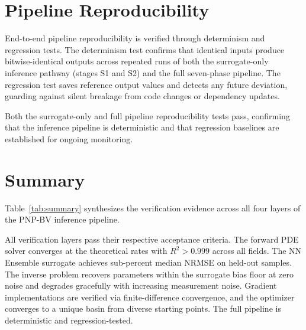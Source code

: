 \documentclass[11pt,a4paper]{article}
\begin{document}
\section{Pipeline Reproducibility}
\label{sec:reproducibility}

End-to-end pipeline reproducibility is verified through determinism and
regression tests. The determinism test confirms that identical inputs
produce bitwise-identical outputs across repeated runs of both the
surrogate-only inference pathway (stages S1 and S2) and the full
seven-phase pipeline. The regression test saves reference output values
and detects any future deviation, guarding against silent breakage from
code changes or dependency updates.

Both the surrogate-only and full pipeline reproducibility tests pass,
confirming that the inference pipeline is deterministic and that
regression baselines are established for ongoing monitoring.

\section{Summary}
\label{sec:summary}

Table~\ref{tab:summary} synthesizes the verification evidence across all
four layers of the PNP-BV inference pipeline.

\begin{table}[htbp]
\centering
\caption{Verification summary across all pipeline layers. Each test
includes the key quantitative result and pass/fail status.}
\label{tab:summary}

\end{table}

All verification layers pass their respective acceptance criteria. The
forward PDE solver converges at the theoretical rates with $R^2 > 0.999$
across all fields. The NN Ensemble surrogate achieves sub-percent median
NRMSE on held-out samples. The inverse problem recovers parameters within
the surrogate bias floor at zero noise and degrades gracefully with
increasing measurement noise. Gradient implementations are verified via
finite-difference convergence, and the optimizer converges to a unique
basin from diverse starting points. The full pipeline is deterministic
and regression-tested.
\end{document}
